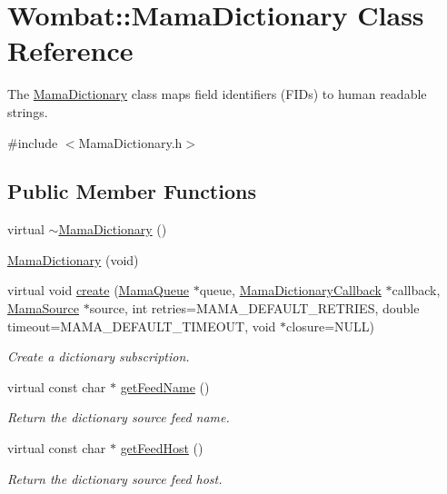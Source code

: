\hypertarget{classWombat_1_1MamaDictionary}{
\section{Wombat::MamaDictionary Class Reference}
\label{classWombat_1_1MamaDictionary}
}


The {\ttfamily \hyperlink{classWombat_1_1MamaDictionary}{MamaDictionary}} class maps field identifiers (FIDs) to human readable strings.  


{\ttfamily \#include $<$MamaDictionary.h$>$}\subsection*{Public Member Functions}
\begin{DoxyCompactItemize}
\item 
virtual \hyperlink{classWombat_1_1MamaDictionary_ae6c0c403cedf5dfa0a2711e4aab7bce0}{$\sim$MamaDictionary} ()
\item 
\hyperlink{classWombat_1_1MamaDictionary_a5afed0397d09f3339af2d08423ba4884}{MamaDictionary} (void)
\item 
virtual void \hyperlink{classWombat_1_1MamaDictionary_ab1f2b4e27ccb5f26c2359e6cf5a7e935}{create} (\hyperlink{classWombat_1_1MamaQueue}{MamaQueue} $\ast$queue, \hyperlink{classWombat_1_1MamaDictionaryCallback}{MamaDictionaryCallback} $\ast$callback, \hyperlink{classWombat_1_1MamaSource}{MamaSource} $\ast$source, int retries=MAMA\_\-DEFAULT\_\-RETRIES, double timeout=MAMA\_\-DEFAULT\_\-TIMEOUT, void $\ast$closure=NULL)
\begin{DoxyCompactList}\small\item\em Create a dictionary subscription. \item\end{DoxyCompactList}\item 
virtual const char $\ast$ \hyperlink{classWombat_1_1MamaDictionary_a18529fcf91c4ff0a63b889d4d60e477c}{getFeedName} ()
\begin{DoxyCompactList}\small\item\em Return the dictionary source feed name. \item\end{DoxyCompactList}\item 
virtual const char $\ast$ \hyperlink{classWombat_1_1MamaDictionary_afd4f16c61e5596589a13954386ee8f34}{getFeedHost} ()
\begin{DoxyCompactList}\small\item\em Return the dictionary source feed host. \item\end{DoxyCompactList}\item 

\end{DoxyCompactItemize}
